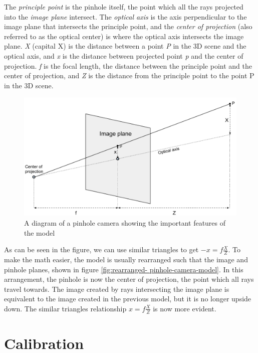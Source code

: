 The \emph{principle point} is the pinhole itself, the point which all the rays
projected into the \emph{image plane} intersect. The \emph{optical axis} is
the axis perpendicular to the image plane that intersects the principle point,
and the \emph{center of projection} (also referred to as the optical center)
is where the optical axis intersects the image plane. \emph{X} (capital X) is
the distance between a point \emph{P} in the 3D scene and the optical axis,
and \emph{x} is the distance between projected point \emph{p} and the center
of projection. \emph{f} is the focal length, the distance between the
principle point and the center of projection, and \emph{Z} is the distance
from the principle point to the point P in the 3D scene.

\begin{figure}[h]
  \centering
  \label{fig:rearranged-pinhole-camera-model}
  \includegraphics[width=\textwidth]{images/rearranged-Pinhole-camera-model.pdf}
  \caption{A diagram of a pinhole camera showing the important features of the model}
\end{figure}

As can be seen in the figure, we can use similar triangles to get $-x =
f\frac{X}{Z}$. To make the math easier, the model is usually rearranged such
that the image and pinhole planes, shown in figure \ref{fig:rearranged-
pinhole-camera-model}. In this arrangement, the pinhole is now the center of
projection, the point which all rays travel towards. The image created by rays
intersecting the image plane is equivalent to the image created in the
previous model, but it is no longer upside down. The similar triangles
relationship $x = f\frac{X}{Z}$ is now more evident.


\section{Calibration}

